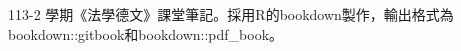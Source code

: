 
\thispagestyle{empty}

\mbox{}
\vspace{10cm}
\begin{center}

    113-2 學期《法學德文》課堂筆記。採用R的bookdown製作，輸出格式為bookdown::gitbook和bookdown::pdf\_book。
    
\end{center}

\setlength{\abovedisplayskip}{-5pt}
\setlength{\abovedisplayshortskip}{-5pt}
